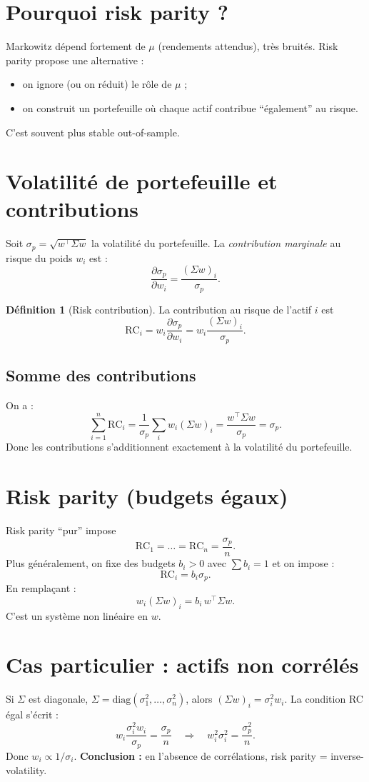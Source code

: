 \documentclass[11pt,a4paper]{report}
\newcommand{\1}{\mathbbm{1}}
\newcommand{\pd}[2]{\frac{\partial #1}{\partial #2}}
\theoremstyle{definition}
\newtheorem{definition}{Définition}[chapter]
\theoremstyle{plain}
\theoremstyle{remark}
\begin{document}
\section{Pourquoi risk parity ?}
Markowitz dépend fortement de $\mu$ (rendements attendus), très bruités.
Risk parity propose une alternative :
\begin{itemize}
  \item on ignore (ou on réduit) le rôle de $\mu$ ;
  \item on construit un portefeuille où chaque actif contribue ``également'' au risque.
\end{itemize}
C'est souvent plus stable out-of-sample.

\section{Volatilité de portefeuille et contributions}
Soit $\sigma_p=\sqrt{w^\top \Sigma w}$ la volatilité du portefeuille.
La \emph{contribution marginale} au risque du poids $w_i$ est :
\[
\pd{\sigma_p}{w_i} = \frac{(\Sigma w)_i}{\sigma_p}.
\]
\begin{definition}[Risk contribution]
La contribution au risque de l'actif $i$ est
\[
\mathrm{RC}_i = w_i \pd{\sigma_p}{w_i} = w_i\frac{(\Sigma w)_i}{\sigma_p}.
\]
\end{definition}

\subsection{Somme des contributions}
On a :
\[
\sum_{i=1}^n \mathrm{RC}_i = \frac{1}{\sigma_p}\sum_i w_i(\Sigma w)_i = \frac{w^\top \Sigma w}{\sigma_p}=\sigma_p.
\]
Donc les contributions s'additionnent exactement à la volatilité du portefeuille.

\section{Risk parity (budgets égaux)}
Risk parity ``pur'' impose
\[
\mathrm{RC}_1=\dots=\mathrm{RC}_n=\frac{\sigma_p}{n}.
\]
Plus généralement, on fixe des budgets $b_i>0$ avec $\sum b_i=1$ et on impose :
\[
\mathrm{RC}_i = b_i \sigma_p.
\]
En remplaçant :
\[
w_i(\Sigma w)_i = b_i\, w^\top\Sigma w.
\]
C'est un système non linéaire en $w$.

\section{Cas particulier : actifs non corrélés}
Si $\Sigma$ est diagonale, $\Sigma=\mathrm{diag}(\sigma_1^2,\dots,\sigma_n^2)$,
alors $(\Sigma w)_i=\sigma_i^2 w_i$.
La condition RC égal s'écrit :
\[
w_i\frac{\sigma_i^2 w_i}{\sigma_p}=\frac{\sigma_p}{n}
\quad\Longrightarrow\quad
w_i^2\sigma_i^2 = \frac{\sigma_p^2}{n}.
\]
Donc $w_i\propto 1/\sigma_i$.
\textbf{Conclusion :} en l'absence de corrélations, risk parity = inverse-volatility.
\end{document}
